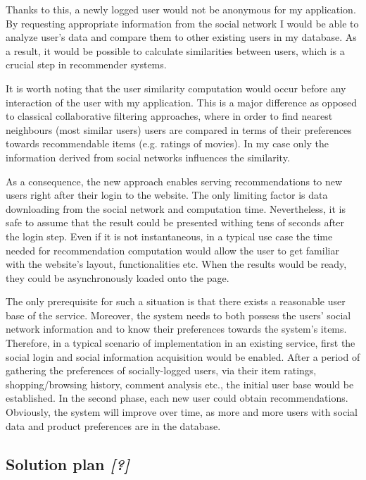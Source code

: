 \documentclass[12pt]{report}
\begin{document}
Thanks to this, a newly logged user would not be anonymous for my application. By requesting appropriate information from the social network I would be able to analyze user's data and compare them to other existing users in my database. As a result, it would be possible to calculate similarities between users, which is a crucial step in recommender systems.

It is worth noting that the user similarity computation would occur before any interaction of the user with my application. This is a major difference as opposed to classical collaborative filtering approaches, where in order to find nearest neighbours (most similar users) users are compared in terms of their preferences towards recommendable items (e.g. ratings of movies). In my case only the information derived from social networks influences the similarity.

As a consequence, the new approach enables serving recommendations to new users right after their login to the website. The only limiting factor is data downloading from the social network and computation time. Nevertheless, it is safe to assume that the result could be presented withing tens of seconds after the login step. Even if it is not instantaneous, in a typical use case the time needed for recommendation computation would allow the user to get familiar with the website's layout, functionalities etc. When the results would be ready, they could be asynchronously loaded onto the page. 

The only prerequisite for such a situation is that there exists a reasonable user base of the service. Moreover, the system needs to both possess the users' social network information and to know their preferences towards the system's items. Therefore, in a typical scenario of implementation in an existing service, first the social login and social information acquisition would be enabled. After a period of gathering the preferences of socially-logged users, via their item ratings, shopping/browsing history, comment analysis etc., the initial user base would be established. In the second phase, each new user could obtain recommendations. Obviously, the system will improve over time, as more and more users with social data and product preferences are in the database.

\subsection{Solution plan \textit{[?]}}
\end{document}
